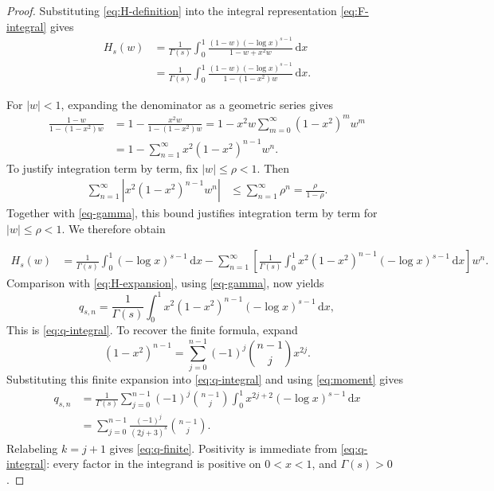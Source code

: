 \documentclass[10pt,a4paper]{amsart}
\newcommand{\dd}{\,\mathrm{d}}
\begin{document}
\begin{proof}
Substituting \eqref{eq:H-definition} into the integral representation
\eqref{eq:F-integral} gives
\[
 \begin{aligned}
 H_s(w)
 &=
 \frac1{\Gamma(s)}
 \int_0^1
 \frac{(1-w)(-\log x)^{s-1}}
 {1-w+x^2w}\dd x\\
 &=
 \frac1{\Gamma(s)}
 \int_0^1
 \frac{(1-w)(-\log x)^{s-1}}
 {1-(1-x^2)w}\dd x.
 \end{aligned}
\]

For \(|w|<1\), expanding the denominator as a geometric series gives
\[
 \begin{aligned}
 \frac{1-w}{1-(1-x^2)w}
 &=
 1-\frac{x^2w}{1-(1-x^2)w}=
 1-x^2w
 \sum_{m=0}^{\infty}(1-x^2)^mw^m\\
 &=
 1-\sum_{n=1}^{\infty}
 x^2(1-x^2)^{n-1}w^n.
 \end{aligned}
\] 
To justify integration term by term, fix \(|w|\leq\rho<1\).  Then
\[
 \begin{aligned}
 \sum_{n=1}^{\infty}
 \left|
 x^2(1-x^2)^{n-1}w^n
 \right|
 &\leq
 \sum_{n=1}^{\infty}\rho^n=
 \frac{\rho}{1-\rho}.
 \end{aligned}
\]
Together with \eqref{eq-gamma}, this bound justifies integration term by
term for \(|w|\leq\rho<1\).  We therefore obtain

\[
 \begin{aligned}
 H_s(w)
 &=
 \frac1{\Gamma(s)}
 \int_0^1(-\log x)^{s-1}\dd x-
 \sum_{n=1}^{\infty}
 \left[
 \frac1{\Gamma(s)}
 \int_0^1
 x^2(1-x^2)^{n-1}
 (-\log x)^{s-1}\dd x
 \right]w^n.
 \end{aligned}
\]
Comparison with \eqref{eq:H-expansion}, using
\eqref{eq-gamma}, now yields
\[
 q_{s,n}
 =
 \frac1{\Gamma(s)}
 \int_0^1
 x^2(1-x^2)^{n-1}
 (-\log x)^{s-1}\dd x,
\]
This is \eqref{eq:q-integral}.  To recover the finite formula, expand
\[
 (1-x^2)^{n-1}
 =
 \sum_{j=0}^{n-1}
 (-1)^j\binom{n-1}{j}x^{2j}.
\]
Substituting this finite expansion into \eqref{eq:q-integral} and
using \eqref{eq:moment} gives
\[
 \begin{aligned}
 q_{s,n}
 &=
 \frac1{\Gamma(s)}
 \sum_{j=0}^{n-1}
 (-1)^j\binom{n-1}{j}
 \int_0^1
 x^{2j+2}(-\log x)^{s-1}\dd x\\
 &=
 \sum_{j=0}^{n-1}
 \frac{(-1)^j}{(2j+3)^s}
 \binom{n-1}{j}.
 \end{aligned}
\]
Relabeling \(k=j+1\) gives \eqref{eq:q-finite}.  Positivity is
immediate from \eqref{eq:q-integral}: every factor in the integrand is
positive on \(0<x<1\), and \(\Gamma(s)>0\).
\end{proof}
\end{document}
